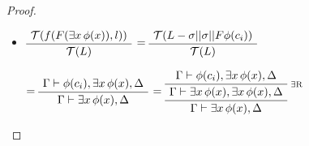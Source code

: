 {\begin{proof}
{\begin {itemize}
   
   $=\AxiomC{$\Gamma, \exists x \, \phi(x), \phi(c_i) \vdash \Delta$}\UnaryInfC{$\Gamma, \exists x \, \phi(x) \vdash \Delta$}\DisplayProof$  
   $=\RightLabel{\scriptsize{$\exists$L}}\AxiomC{$\Gamma, \exists x \, \phi(x), \phi(c_i) \vdash \Delta$}\UnaryInfC{$\Gamma, \exists x \, \phi(x), \exists x \, \phi(x) \vdash \Delta$}\UnaryInfC{$\Gamma, \exists x \, \phi(x) \vdash \Delta$}\DisplayProof$
   
   and $c_i$ does not occour in $\Gamma$ or $\Delta$, as it is a new one.
   \item 
   $\AxiomC{$\mathcal{T}( f(F(\exists x \, \phi(x)),l))$}\UnaryInfC{$\mathcal{T}(L)$}\DisplayProof$  
   $=\AxiomC{$\mathcal{T}( L - \sigma|| \sigma || F \phi(c_i) )$}\UnaryInfC{$\mathcal{T}(L)$}\DisplayProof$  
   
   
   $=\AxiomC{$\Gamma \vdash \phi(c_i), \exists x \, \phi(x), \Delta$}\UnaryInfC{$\Gamma \vdash \exists x \, \phi(x), \Delta$}\DisplayProof$  
   $=\RightLabel{\scriptsize{$\exists$R}}\AxiomC{$\Gamma \vdash \phi(c_i), \exists x \, \phi(x), \Delta$}\UnaryInfC{$\Gamma \vdash \exists x \, \phi(x), \exists x \, \phi(x), \Delta$}\UnaryInfC{$\Gamma \vdash \exists x \, \phi(x), \Delta$}\DisplayProof$
   
   \end  {itemize}
   }
       
   
   \end{proof}
}

